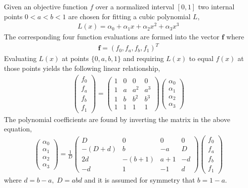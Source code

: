 Given an objective function $f$ over a normalized interval $[0,1]$ two internal points $0 < a < b < 1$ are chosen for fitting a cubic polynomial $L$,
\begin{align*}
L(x) = \alpha_0 + \alpha_1x + \alpha_2x^2 + \alpha_3x^3
\end{align*}
The corresponding four function evaluations are formed into the vector $\mathbf{f}$ where
\begin{align*}
\mathbf{f} = (f_0, f_a, f_b, f_1)^T
\end{align*}
Evaluating $L(x)$ at points $\{0,a,b,1\}$ and requiring $L(x)$ to equal $f(x)$ at those points yields the following linear relationship,
\begin{align*}
\begin{pmatrix}f_0\\f_a\\f_b\\f_1\end{pmatrix} = 
\begin{pmatrix}1&0&0&0\\1&a&a^2&a^3\\1&b&b^2&b^3\\1&1&1&1\end{pmatrix}
\begin{pmatrix}\alpha_0\\\alpha_1\\\alpha_2\\\alpha_3\end{pmatrix}
\end{align*}
The polynomial coefficients are found by inverting the matrix in the above equation,
\begin{align*}
\begin{pmatrix}\alpha_0\\\alpha_1\\\alpha_2\\\alpha_3\end{pmatrix} =
\frac{1}{D}
\begin{pmatrix}D&0&0&0\\
-(D+d)&b&-a&D\\
2d&-(b+1)&a+1&-d\\
-d&1&-1&d
\end{pmatrix}
\begin{pmatrix}f_0\\f_a\\f_b\\f_1\end{pmatrix}
\end{align*}
where $d = b-a,\; D = abd$ and it is assumed for symmetry that $b = 1 - a$.


